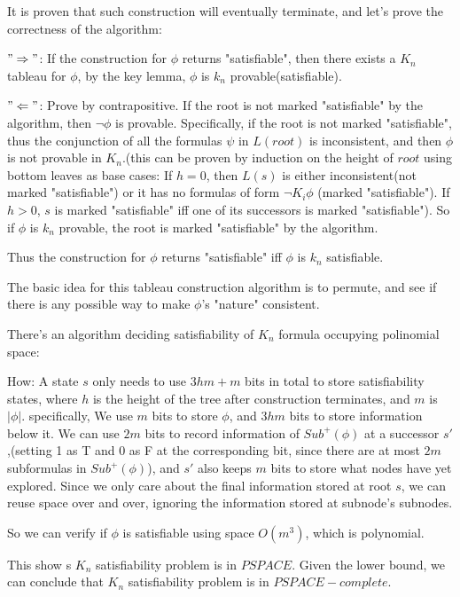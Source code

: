 \documentclass{article}
\begin{document}
\par It is proven that such construction will eventually terminate, and let's prove the correctness of the algorithm:
\par $"\Rightarrow"$: If the construction for $\phi$ returns "satisfiable", then there exists a $K_n$ tableau for $\phi$, by the key lemma, $\phi$ is $k_n$ provable(satisfiable).
\par $"\Leftarrow"$: Prove by contrapositive. If the root is not marked "satisfiable" by the algorithm, then $\lnot \phi$ is provable. Specifically, if the root is not marked "satisfiable", thus the conjunction of all the formulas $\psi$ in $L(root)$ is inconsistent, and then $\phi$ is not provable in $K_n$.(this can be proven by induction on the height of $root$ using bottom leaves as base cases: If $h=0$, then $L(s)$ is either inconsistent(not marked "satisfiable") or it has no formulas of form $\lnot K_i\phi$ (marked "satisfiable"). If $h>0$, $s$ is marked "satisfiable" iff one of its successors is marked "satisfiable"). So if $\phi$ is $k_n$ provable, the root is marked "satisfiable" by the algorithm.
\par Thus the construction for $\phi$ returns "satisfiable" iff $\phi$ is $k_n$ satisfiable.
\par The basic idea for this tableau construction algorithm is to permute, and see if there is any possible way to make $\phi$'s "nature" consistent.\\
\par There's an algorithm deciding satisfiability of $K_n$ formula occupying polinomial space:
\par How: A state $s$ only needs to use $3hm+m$ bits in total to store satisfiability states, where $h$ is the height of the tree after construction terminates, and $m$ is $|\phi|$. specifically, We use $m$ bits to store $\phi$, and $3hm$ bits to store information below it. We can use $2m$ bits to record information of $Sub^+(\phi)$ at a successor $s'$,(setting 1 as T and 0 as F at the corresponding bit, since there are at most $2m$ subformulas in $Sub^+(\phi)$), and $s'$ also keeps $m$ bits to store what nodes have yet explored. Since we only care about the final information stored at root $s$, we can reuse space over and over, ignoring the information stored at subnode's subnodes.
\par So we can verify if $\phi$ is satisfiable using space $O(m^3)$, which is polynomial.
\par This show s $K_n$ satisfiability problem is in $PSPACE$. Given the lower bound, we can conclude that $K_n$ satisfiability problem is in $PSPACE-complete$.
\end{document}
